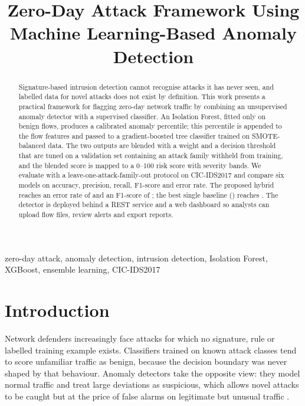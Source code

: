 \documentclass[conference]{IEEEtran}
\newcommand{\hybErr}{}\newcommand{\hybFscore}{}\newcommand{\hybPrec}{}\newcommand{\hybRec}{}\newcommand{\hybAcc}{}
\newcommand{\bestBaseName}{}\newcommand{\bestBaseErr}{}\newcommand{\relRedBase}{}\newcommand{\paperErr}{}\newcommand{\relRedPaper}{}
\begin{document}
\title{Zero-Day Attack Framework Using Machine Learning-Based Anomaly Detection}

\author{
}

\maketitle

\begin{abstract}
Signature-based intrusion detection cannot recognise attacks it has never seen, and labelled data for novel attacks does not exist by definition. This work presents a practical framework for flagging zero-day network traffic by combining an unsupervised anomaly detector with a supervised classifier. An Isolation Forest, fitted only on benign flows, produces a calibrated anomaly percentile; this percentile is appended to the flow features and passed to a gradient-boosted tree classifier trained on SMOTE-balanced data. The two outputs are blended with a weight and a decision threshold that are tuned on a validation set containing an attack family withheld from training, and the blended score is mapped to a 0--100 risk score with severity bands. We evaluate with a leave-one-attack-family-out protocol on CIC-IDS2017 and compare six models on accuracy, precision, recall, F1-score and error rate. The proposed hybrid reaches an error rate of \hybErr{} and an F1-score of \hybFscore{}; the best single baseline (\bestBaseName) reaches \bestBaseErr{}. The detector is deployed behind a REST service and a web dashboard so analysts can upload flow files, review alerts and export reports.
\end{abstract}

\begin{IEEEkeywords}
zero-day attack, anomaly detection, intrusion detection, Isolation Forest, XGBoost, ensemble learning, CIC-IDS2017
\end{IEEEkeywords}

\section{Introduction}
Network defenders increasingly face attacks for which no signature, rule or labelled training example exists. Classifiers trained on known attack classes tend to score unfamiliar traffic as benign, because the decision boundary was never shaped by that behaviour. Anomaly detectors take the opposite view: they model normal traffic and treat large deviations as suspicious, which allows novel attacks to be caught but at the price of false alarms on legitimate but unusual traffic \cite{chandola2009anomaly}.
\end{document}
